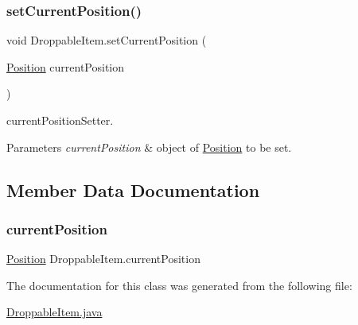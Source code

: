 \subsubsection{\texorpdfstring{set\+Current\+Position()}{setCurrentPosition()}}
{\footnotesize\ttfamily void Droppable\+Item.\+set\+Current\+Position (\begin{DoxyParamCaption}\item[{\mbox{\hyperlink{class_position}{Position}}}]{current\+Position }\end{DoxyParamCaption})\hspace{0.3cm}{\ttfamily [inline]}}

current\+Position\+Setter. 
\begin{DoxyParams}{Parameters}
{\em current\+Position} & object of \mbox{\hyperlink{class_position}{Position}} to be set. \\
\hline
\end{DoxyParams}


\subsection{Member Data Documentation}
\mbox{\label{class_droppable_item_a9215c9fa588c9bd5aae4da387121b75c}} 
\subsubsection{\texorpdfstring{current\+Position}{currentPosition}}
{\footnotesize\ttfamily \mbox{\hyperlink{class_position}{Position}} Droppable\+Item.\+current\+Position\hspace{0.3cm}{\ttfamily [protected]}}



The documentation for this class was generated from the following file\+:\begin{DoxyCompactItemize}
\item 
\mbox{\hyperlink{_droppable_item_8java}{Droppable\+Item.\+java}}\end{DoxyCompactItemize}
